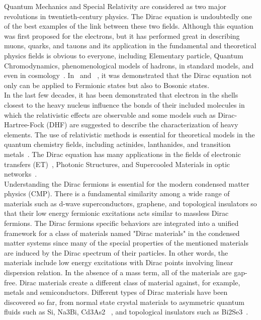 \documentclass[twocolumn,aps,prb,showpacs]{revtex4-1}
\begin{document}
Quantum Mechanics and Special Relativity are considered as two major revolutions in twentieth-century physics.
The Dirac equation is undoubtedly one of the best examples of the link between these two fields. Although this equation was first proposed for the electrons, but it has performed great in describing muons, quarks, and tauons and its application in the fundamental and theoretical physics fields is obvious to
everyone, including Elementary particle, Quantum Chromodynamics, phenomenological
models of hadrons, in standard models, and even in cosmology~\cite{Ref1,Ref2,Ref3,Ref4}. In~\cite{Ref5} and ~\cite{Ref6}, it was demonstrated
that the Dirac equation not only can be applied to Fermionic states but also to Bosonic states.\\
In the last few decades, it has been demonstrated that electron in the shells closest to the
heavy nucleus influence the bonds of their included molecules in which the relativistic effects
are observable and some models such as Dirac-Hartree-Fock (DHF) are suggested to describe
the characterization of heavy elements. The use of relativistic methods is essential for
theoretical models in the quantum chemistry fields, including actinides, lanthanides, and
transition metals~\cite{Ref7}. The Dirac equation has many applications in the fields of electronic
transfers (ET)~\cite{Ref8}, Photonic Structures, and Supercooled Materials in optic networks~\cite{Ref9,Ref10,Ref11}.\\
Understanding the Dirac fermions is essential for the modern condensed matter
physics (CMP). There is a fundamental similarity among a wide range of materials such as d-wave
superconductors, graphene, and topological insulators so that their low energy
fermionic excitations acts similar to massless Dirac fermions. The Dirac fermions specific
behaviors are integrated into a unified framework for a class of materials named "Dirac
materials" in the condensed matter systems since many of the special properties of the
mentioned materials are induced by the Dirac spectrum of their particles. In other words, the
materials include low energy excitations with Dirac points involving linear dispersion
relation. In the absence of a mass term, all of the materials are gap-free. Dirac materials
create a different class of material against, for example, metals and semiconductors. Different
types of Dirac materials have been discovered so far, from normal state crystal materials to
asymmetric quantum fluids such as Si, Na3Bi, Cd3As2 ~\cite{Ref12}, and topological insulators such
as Bi2Se3~\cite{Ref13}.\\
\end{document}

